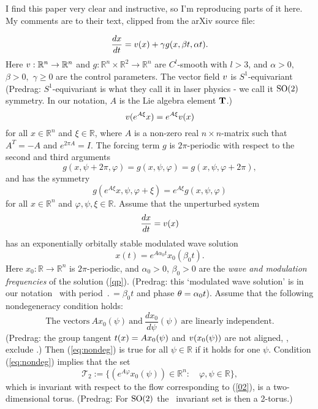 \begin{description}
I find this paper very clear and instructive, so I'm reproducing parts of
it here. My comments are to their text, clipped from the arXiv source
file:

\begin{equation}
\frac{dx}{dt}=v(x)+\gamma g(x,\beta t,\alpha t).
\label{01}
\end{equation}
Here $v:\mathbb{R}^{n}\to\mathbb{R}^{n}$ and
$g:\mathbb{R}^{n}\times\mathbb{R}^{2}\to\mathbb{R}^{n}$ are
$C^{l}$-smooth with $l>3$, and $\alpha>0,$ $\beta>0,$ $\gamma\ge0$ are
the control parameters. The vector field $v$ is $S^{1}$-equivariant
(Predrag:
$S^{1}$-equivariant is what they call it in laser physics - we call it
$\textrm{SO}(2)$ symmetry. In our notation, $A$ is the Lie algebra element $\mathbf{T}$.)
\begin{equation}
v(e^{A\xi}x)=e^{A\xi}v(x)
\label{eq:symf}
\end{equation}
for all $x\in\mathbb{R}^{n}$ and $\xi\in\mathbb{R}$, where $A$
is a non-zero real $n\times n$-matrix such that $A^{T}=-A$ and $e^{2\pi A}=I$.
The forcing term $g$ is $2\pi$-periodic with respect
to the second and third arguments
\[
g(x,\psi+2\pi,\varphi)=g(x,\psi,\varphi)=g(x,\psi,\varphi+2\pi),
\]
 and has the symmetry
\begin{equation}
g(e^{A\xi}x,\psi,\varphi+\xi)=e^{A\xi}g(x,\psi,\varphi)
\label{eq:symg}
\end{equation}
 for all $x\in\mathbb{R}^{n}$ and $\varphi,\psi,\xi\in\mathbb{R}.$
Assume that the unperturbed system
\begin{equation}
\frac{dx}{dt}=v(x)\label{02}
\end{equation}
 has an exponentially orbitally stable modulated wave solution
\begin{equation}
x(t)=e^{A\alpha_{0}t}x_{0}(\beta_{0}t).
\label{qp}
\end{equation}
                                                                \toCB
Here $x_{0}:\mathbb{R}\to\mathbb{R}^{n}$ is $2\pi$-periodic, and
$\alpha_{0}>0$, $\beta_{0}>0$ are the \emph{wave and modulation
frequencies} of the solution (\ref{qp}). (Predrag: this `modulated wave
solution' is in our notation \rpo\ with period $\period{}=\beta_{0}t$ and
phase ${\bf \theta} =\alpha_{0}t$).
Assume that the following nondegeneracy
condition holds:
\begin{equation}
\mbox{The vectors}\ Ax_{0}(\psi)\ \mbox{and}\
     \frac{dx_{0}}{d\psi}(\psi)\ \mbox{are linearly independent.}
\label{eq:nondeg}
\end{equation}
(Predrag:
the group tangent $t(x) =  Ax_{0}(\psi)$ and $v(x_{0}(\psi))$
are not aligned, \ie, exclude \reqva.)
Then (\ref{eq:nondeg}) is true for all $\psi\in\mathbb{R}$
if it holds for one $\psi$. Condition (\ref{eq:nondeg}) implies
that the set
\begin{equation}
\mathcal{T}_{2}:=\{(e^{A\varphi}x_{0}(\psi))\in\mathbb{R}^{n}:\quad\varphi,\psi\in\mathbb{R}\},
\label{eq:torus}
\end{equation}
which is invariant with respect to the flow corresponding to (\ref{02}),
is a two-dimensional torus.
(Predrag:
For $\textrm{SO}(2)$ the \rpo\ invariant set is then a
2-torus.)


\end{description}
